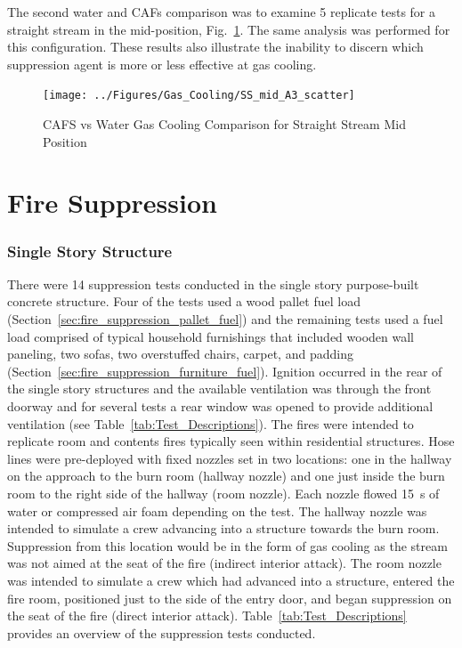 \documentclass[12pt,oneside]{book}
\begin{document}
The second water and CAFs comparison was to examine 5 replicate tests for a straight stream in the mid-position, Fig.~\ref{fig:CAFS_Water_Comp_SS_mid}. The same analysis was performed for this configuration. These results also illustrate the inability to discern which suppression agent is more or less effective at gas cooling.


\begin{figure}[!ht]
	\texttt{[image: ../Figures/Gas\_Cooling/SS\_mid\_A3\_scatter]}
	\caption{CAFS vs Water Gas Cooling Comparison for Straight Stream Mid Position}
	\label{fig:CAFS_Water_Comp_SS_mid}
\end{figure}

\clearpage

\section{Fire Suppression}
\label{sec:Fire_Suppression}

\subsubsection*{Single Story Structure}
\label{sec:fire_supp_single}

There were 14 suppression tests conducted in the single story purpose-built concrete structure. Four of the tests used a wood pallet fuel load (Section~\ref{sec:fire_suppression_pallet_fuel}) and the remaining tests used a fuel load comprised of typical household furnishings that included wooden wall paneling, two sofas, two overstuffed chairs, carpet, and padding (Section~\ref{sec:fire_suppression_furniture_fuel}). Ignition occurred in the rear of the single story structures and the available ventilation was through the front doorway and for several tests a rear window was opened to provide additional ventilation (see Table~\ref{tab:Test_Descriptions}). The fires were intended to replicate room and contents fires typically seen within residential structures. Hose lines were pre-deployed with fixed nozzles set in two locations: one in the hallway on the approach to the burn room (hallway nozzle) and one just inside the burn room to the right side of the hallway (room nozzle). Each nozzle flowed 15~s of water or compressed air foam depending on the test. The hallway nozzle was intended to simulate a crew advancing into a structure towards the burn room. Suppression from this location would be in the form of gas cooling as the stream was not aimed at the seat of the fire (indirect interior attack). The room nozzle was intended to simulate a crew which had advanced into a structure, entered the fire room, positioned just to the side of the entry door, and began suppression on the seat of the fire (direct interior attack). Table~\ref{tab:Test_Descriptions} provides an overview of the suppression tests conducted.
\end{document}
